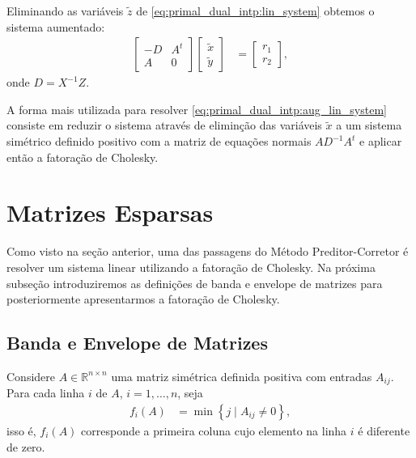 Eliminando as variáveis $\tilde{z}$ de \eqref{eq:primal_dual_intp:lin_system}
obtemos o sistema aumentado:
\begin{align}
    \begin{bmatrix}
        -D & A^t \\
        A & 0
    \end{bmatrix} \begin{bmatrix}
        \tilde{x} \\
        \tilde{y}
    \end{bmatrix} &= \begin{bmatrix}
        r_1 \\
        r_2
    \end{bmatrix},
    \label{eq:primal_dual_intp:aug_lin_system}
\end{align}
onde $D = X^{-1} Z$.

A forma mais utilizada para resolver \eqref{eq:primal_dual_intp:aug_lin_system}
consiste em reduzir o sistema através de eliminção das variáveis $\tilde{x}$ a
um sistema simétrico definido positivo com a matriz de equações normais $A
D^{-1} A^t$ e aplicar então a fatoração de Cholesky.

\section{Matrizes Esparsas}
Como visto na seção anterior, uma das passagens do Método Preditor-Corretor é
resolver um sistema linear utilizando a fatoração de Cholesky. Na próxima
subseção introduziremos as definições de banda e envelope de matrizes para
posteriormente apresentarmos a fatoração de Cholesky.

\subsection{Banda e Envelope de Matrizes}
Considere $A \in \mathbb{R}^{n \times n}$ uma matriz simétrica definida positiva
com entradas $A_{ij}$. Para cada linha $i$ de $A$, $i = 1, \ldots, n$, seja
\begin{align*}
    f_i(A) &= \min\left\{ j \mid A_{ij} \neq 0 \right\},
\end{align*}
isso é, $f_i(A)$ corresponde a primeira coluna cujo elemento na linha $i$ é
diferente de zero.

